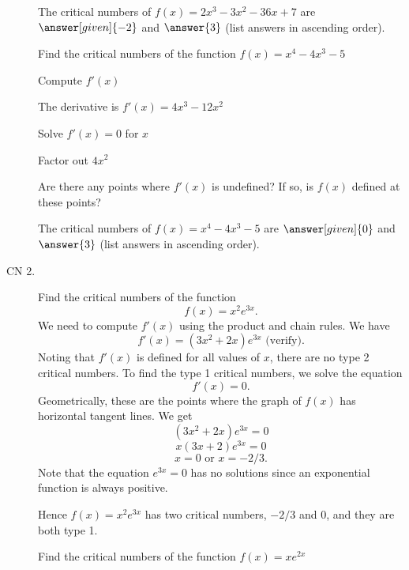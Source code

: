 \documentclass{ximera}
\begin{document}
\begin{description}
\begin{question}
    
		The critical numbers of $f(x) = 2x^3 - 3x^2 -36x + 7$ are
		 $\answer[given]{-2}$ and $\answer{3}$ (list answers in ascending order).
		\end{question}



\begin{question} %
  Find the critical numbers of the function $f(x) = x^4 - 4x^3 - 5$
  
    \begin{hint}
      Compute $f'(x)$
    \end{hint}
    \begin{hint}
      The derivative is $f'(x) = 4x^3 - 12x^2$
    \end{hint}
		\begin{hint}
      Solve $f'(x) = 0$ for $x$
    \end{hint}
		\begin{hint}
      Factor out $4x^2$
    \end{hint}
    \begin{hint}
      Are there any points where $f'(x)$ is undefined?
      If so, is $f(x)$ defined at these points?  
		\end{hint}
    
    
		The critical numbers of $f(x) = x^4 - 4x^3 - 5$ are
		 $\answer[given]{0}$ and $\answer{3}$ (list answers in ascending order).
		
\end{question}




\item[CN 2.] Find the critical numbers of the function 
\[f(x) = x^2e^{3x}.\]
We need to compute $f'(x)$ using the product and chain rules.  We have
\[f'(x) = (3x^2 +2x)e^{3x} \mbox{   (verify)}.\]
Noting that $f'(x)$ is defined for all values of $x$, there are no type 2 critical numbers.
To find the type 1 critical numbers, we solve the equation
\[f'(x) = 0.\]
Geometrically, these are the points where the graph of $f(x)$ has horizontal tangent lines.
We get
\[ (3x^2 +2x)e^{3x} =0\]
\[ x(3x+2)e^{3x} =0\]
\[x = 0 \mbox{   or   }  x = -2/3.\]
Note that the equation $e^{3x} = 0$ has no solutions since an exponential function is always positive.

Hence $f(x) = x^2e^{3x}$ has two critical numbers, $-2/3$ and $0$, and they are both type 1. 


\begin{question} %
  Find the critical numbers of the function $f(x) = xe^{2x}$
  

\end{question}
\end{description}
\end{document}
